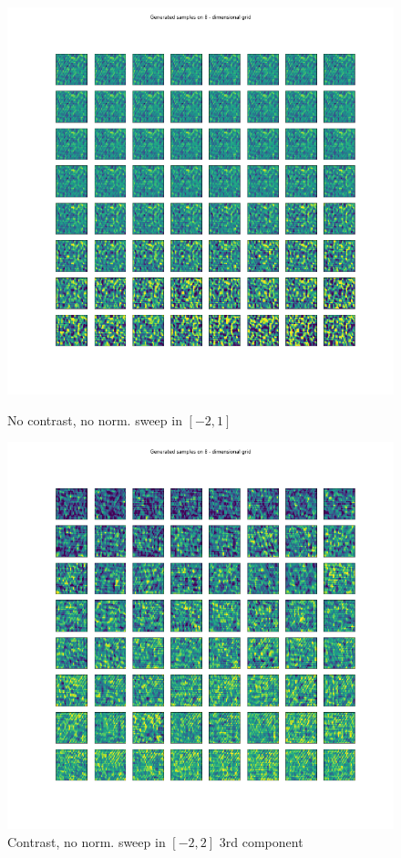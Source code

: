 \documentclass[12pt, english]{article}
\begin{document}
\begin{figure}[H] 
  \label{fig:contrast-correlation} 
  \begin{minipage}[b]{0.33\linewidth}
    \centering
    \includegraphics[width=.72\linewidth]{sweep/no_norm_no_contrast_sweep_minus_two_to_one.png} 
    \caption{No contrast, no \newline norm. sweep in $[-2, 1]$} 
    \label{fig:no-contrast-no-norm-sweep}
  \end{minipage}%
  \begin{minipage}[b]{0.33\linewidth}
    \centering
    \includegraphics[width=.72\linewidth]{sweep/no_norm_contrast_sweep_minus_two_to_two_3rd_param.png} 
    \caption{Contrast, no norm. \newline sweep in $[-2, 2]$ $3$rd component} 
    \label{fig:contrast-no-norm-sweep-3}

\end{minipage}
\end{figure}
\end{document}
